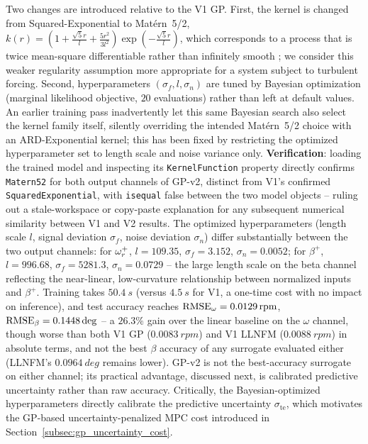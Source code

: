 Two changes are introduced relative to the V1 GP. {\color{auditP2}First, the kernel is
changed from Squared-Exponential to Matérn~5/2,
$k(r) = \left(1 + \tfrac{\sqrt{5}r}{l} + \tfrac{5r^2}{3l^2}\right)
\exp\!\left(-\tfrac{\sqrt{5}r}{l}\right)$, which corresponds to a process that
is twice mean-square differentiable rather than infinitely smooth
\cite{rasmussen2006}; we consider this weaker regularity assumption more
appropriate for a system subject to turbulent forcing.} Second, hyperparameters
$(\sigma_f, l, \sigma_n)$ are tuned by Bayesian optimization (marginal
likelihood objective, $20$ evaluations) rather than left at default values.
An earlier training pass inadvertently let this same Bayesian search
also select the kernel family itself, silently overriding the intended
Mat\'ern~5/2 choice with an ARD-Exponential kernel; this has been
fixed by restricting the optimized hyperparameter set to length scale
and noise variance only. \textbf{Verification}: loading the trained
model and inspecting its \texttt{KernelFunction} property directly
confirms \texttt{Matern52} for both output channels of GP-v2, distinct
from V1's confirmed \texttt{SquaredExponential}, with
\texttt{isequal} false between the two model objects -- ruling out a
stale-workspace or copy-paste explanation for any subsequent numerical
similarity between V1 and V2 results. The optimized hyperparameters
(length scale $l$, signal deviation $\sigma_f$, noise deviation
$\sigma_n$) differ substantially between the two output channels: for
$\omega_r^{+}$, $l=109.35$, $\sigma_f=3.152$, $\sigma_n=0.0052$; for
$\beta^{+}$, $l=996.68$, $\sigma_f=5281.3$, $\sigma_n=0.0729$ -- the
large length scale on the beta channel reflecting the near-linear,
low-curvature relationship between normalized
inputs and $\beta^{+}$. Training takes $\SI{50.4}{s}$ (versus
$\SI{4.5}{s}$ for V1, a one-time cost with no impact on inference), and
test accuracy reaches $\text{RMSE}_{\omega}=\SI{0.0129}{rpm}$,
$\text{RMSE}_{\beta}=0.1448\deg$ -- a $26.3\%$ gain over the linear baseline
on the $\omega$ channel, though worse than both V1 GP
($\SI{0.0083}{rpm}$) and V1 LLNFM ($\SI{0.0088}{rpm}$) in absolute
terms, and not the best $\beta$ accuracy of any surrogate evaluated
either (LLNFM's $\SI{0.0964}{deg}$ remains lower). GP-v2 is not the
best-accuracy surrogate on either channel; its practical advantage,
discussed next, is calibrated predictive uncertainty rather than
raw accuracy. Critically,
the Bayesian-optimized hyperparameters directly calibrate the predictive
uncertainty $\sigma_{\text{te}}$, which motivates the GP-based
uncertainty-penalized MPC cost introduced in
Section~\ref{subsec:gp_uncertainty_cost}.

